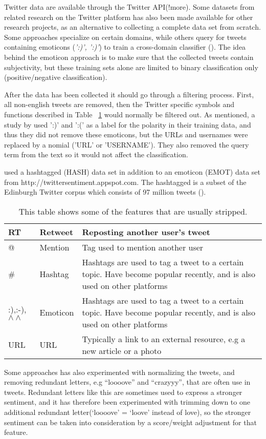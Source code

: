 Twitter data are available through the Twitter API(!more). Some datasets from related research on the Twitter platform has also been made available for other research projects, as an alternative to collecting a complete data set from scratch. Some approaches specialize on certain domains, while others query for tweets containing emoticons (\emph{':)', ':)'}) to train a cross-domain classifier  (\cite{article:go}). The idea behind the emoticon approach is to make sure that the collected tweets contain subjectivity, but these training sets alone are limited to binary classification only (positive/negative classification).

After the data has been collected it should go through a filtering process. First, all non-english tweets are removed, then the Twitter specific symbols and functions described in Table ~\ref{tab:features} would normally be filtered out. As mentioned, a study by \cite{article:go} used ':)' and ':(' as a label for the polarity in their training data, and thus they did not remove these emoticons, but the URLs and usernames were replaced by a nomial ('URL' or 'USERNAME'). They also removed the query term from the text so it would not affect the classification.

\cite{article:omg} used a hashtagged (HASH) data set in addition to an emoticon (EMOT) data set from http://twittersentiment.appspot.com. The hashtagged is a subset of the Edinburgh Twitter corpus which consists of 97 million tweets (\cite{article:edinburgh}).

\begin{table}[]
\centering
\label{tab:features}
\begin{tabular}{|l|l|p{8cm}|}
\hline
RT & Retweet & Reposting another user’s tweet \\ \hline
@ & Mention & Tag used to mention another user \\ \hline
\# & Hashtag & Hashtags are used to tag a tweet to a certain topic. Have become popular recently, and is also used on other platforms \\ \hline
:),:-),$\wedge\wedge$ & Emoticon & Hashtags are used to tag a tweet to a certain topic. Have become popular recently, and is also used on other platforms \\ \hline
URL & URL & Typically a link to an external resource, e.g a new article or a photo \\ \hline
\end{tabular}
\caption{This table shows some of the features that are usually stripped.}
\end{table}

Some approaches has also experimented with normalizing the tweets, and removing redundant letters, e.g “loooove” and “crazyyy”, that are often use in tweets. Redundant letters like this are sometimes used to express a stronger sentiment, and it has therefore been experimented with trimming down to one additional redundant letter(‘loooove’ = ‘loove’ instead of love), so the stronger sentiment can be taken into consideration by a score/weight adjustment for that feature.

